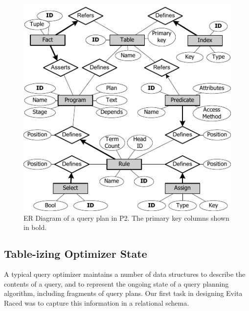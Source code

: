 \begin{figure}
\ssp
\begin{center}
\includegraphics[scale=1.4]{figures/ERDiagram}
\caption{ER Diagram of a query plan in P2. The primary key columns shown in bold.}
\label{ch:evita:fig:p2er}
\end{center}
\end{figure}

\subsection{Table-izing Optimizer State} 

A typical query optimizer maintains a number of data structures to describe the
contents of a query, and to represent the ongoing state of a query planning
algorithm, including fragments of query plans.  Our first task in designing
Evita Raced was to capture this information in a relational schema.

